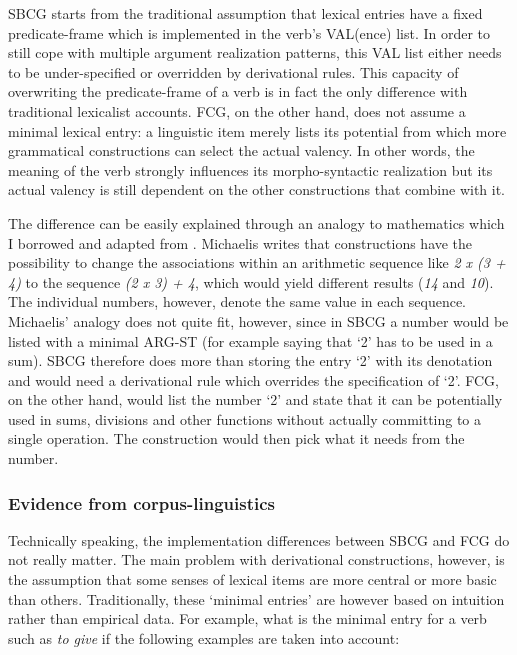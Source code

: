 SBCG starts from the traditional assumption that lexical entries have a fixed predicate-frame which is implemented in the verb's VAL(ence) list. In order to still cope with multiple argument realization patterns, this VAL list either needs to be under-specified or overridden by derivational rules. This capacity of overwriting the predicate-frame of a verb is in fact the only difference with traditional lexicalist accounts. FCG, on the other hand, does not assume a minimal lexical entry: a linguistic item merely lists its potential from which more grammatical constructions can select the actual valency. In other words, the meaning of the verb strongly influences its morpho-syntactic realization but its actual valency is still dependent on the other constructions that combine with it.

The difference can be easily explained through an analogy to mathematics which I borrowed and adapted from \citet{michaelis06complementation}. Michaelis writes that constructions have the possibility to change the associations within an arithmetic sequence like {\em 2 x (3 + 4)} to the sequence {\em (2 x 3) + 4}, which would yield different results ({\em 14} and {\em 10}). The individual numbers, however, denote the same value in each sequence. Michaelis' analogy does not quite fit, however, since in SBCG a number would be listed with a minimal ARG-ST (for example saying that `2' has to be used in a sum). SBCG therefore does more than storing the entry `2' with its denotation and would need a derivational rule which overrides the specification of `2'. FCG, on the other hand, would list the number `2' and state that it can be potentially used in sums, divisions and other functions without actually committing to a single operation. The construction would then pick what it needs from the number.


\subsubsection{Evidence from corpus-linguistics}
Technically speaking, the implementation differences between SBCG and FCG do not really matter. The main problem with derivational constructions, however, is the assumption that some senses of lexical items are more central or more basic than others. Traditionally, these `minimal entries' are however based on intuition rather than empirical data. For example, what is the minimal entry for a verb such as {\em to give} if the following examples are taken into account:

